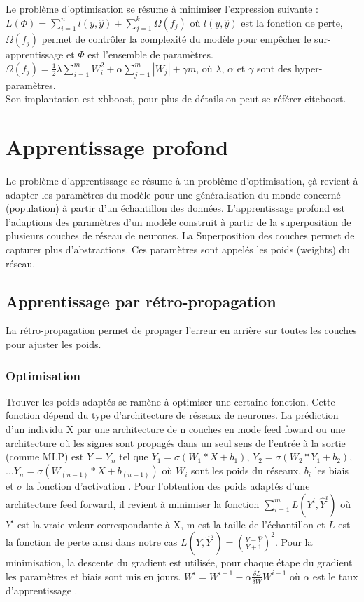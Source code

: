 Le problème d'optimisation se résume à minimiser l'expression suivante : \\
$L(\Phi) = \sum \limits_{i=1}^n l(y, \widehat{y}) + \sum \limits_{j=1}^k \Omega(f_j)$ où $l(y, \widehat{y})$ est la fonction de perte, $\Omega(f_j)$ permet de contrôler la complexité du modèle pour empêcher le sur-apprentissage et $\Phi$ est l'ensemble de paramètres. $\Omega(f_j) = \frac{1}{2} \lambda \sum \limits_{i=1}^m W_{i}^2 + \alpha\sum \limits_{j = 1}^m |W_j| + \gamma m$, où $\lambda$, $\alpha$ et $\gamma$ sont des hyper-paramètres. \\Son implantation est xbboost, pour plus de détails on peut se référer cite{boost}.

\section{Apprentissage profond}
Le problème d'apprentissage se résume à un problème d'optimisation, çà revient à adapter les paramètres du modèle pour une généralisation du monde concerné (population) à partir d'un échantillon des données. L'apprentissage profond est l'adaptions des paramètres d'un modèle construit à partir de la superposition de plusieurs couches de réseau de neurones. La Superposition des couches permet de capturer plus d'abstractions. Ces paramètres sont appelés les poids (weights) du réseau.
\subsection{Apprentissage par rétro-propagation}
La rétro-propagation permet de propager l'erreur en arrière sur toutes les couches pour ajuster les poids.
\subsubsection{Optimisation}
Trouver les poids adaptés se ramène à optimiser une certaine fonction. Cette fonction dépend du type d'architecture de réseaux de neurones. La prédiction d'un individu X par une architecture de n couches en mode feed foward ou une architecture où les signes sont propagés dans un seul sens de l'entrée à la sortie (comme MLP) est $\widehat{Y} = Y_n$ tel que $Y_1 = \sigma(W_1*X + b_1)$, $Y_2 = \sigma(W_2*Y_1 + b_2)$, $... Y_n = \sigma(W_{(n-1)}*X + b_{(n-1)})$ où $W_i$ sont les poids du réseaux, $b_i$ les biais et $\sigma$ la fonction d'activation \cite{relu, rnna, erc}. Pour l'obtention des poids adaptés d'une architecture feed forward, il revient à minimiser la fonction $\sum \limits_{i=1}^m L(Y^i, \widehat{Y}^i)$ où $Y^i$ est la vraie valeur correspondante à X, m est la taille de l'échantillon et $L$ est la fonction de perte ainsi dans notre cas $L(Y, \widehat{Y}^i) = (\frac{Y-\widehat{Y}}{Y+1})^2$. Pour la minimisation, la descente du gradient est utilisée, pour chaque étape du gradient les paramètres et biais sont mis en jours. $W^i = W^{i-1} - \alpha \frac{\delta L}{\delta W} W^{i-1}$ où $\alpha$ est le taux d'apprentissage .\\

